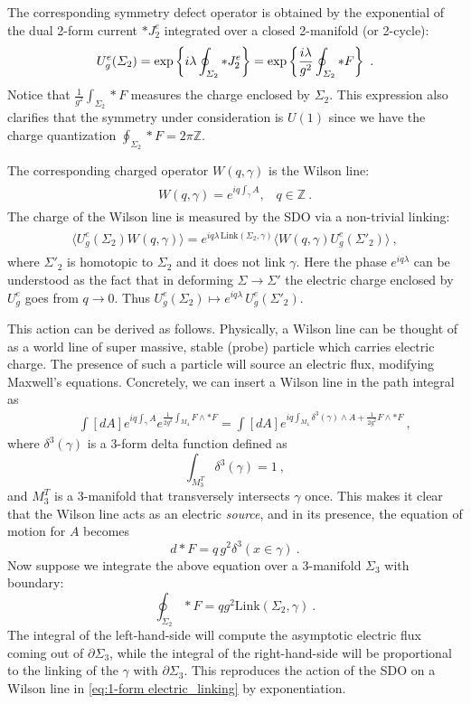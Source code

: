 \documentclass[11pt]{article}
\newcommand{\eq}[1]{\begin{align}\begin{split}#1\end{split}\end{align}}
\def\exp{{\rm exp}}
\def\IZ{{\mathbb{Z}}}
\def\beq{\begin{equation}}
\def\eeq{\end{equation}}
\def\bea{\begin{eqnarray}}
\def\eea{\end{eqnarray}}
\begin{document}
The corresponding symmetry defect operator is obtained by the exponential of the dual 2-form current $\ast J_2^e$ integrated over a closed 2-manifold (or 2-cycle): 
%
\eq{
 U^e_g(\Sigma_2)=\exp\left\{i \lambda \oint_{\Sigma_2} \ast J_2^e\right\}=\exp\left\{\frac{i \lambda }{g^2}\oint_{\Sigma_2} \ast F\right\}~.
}
Notice that $\frac{1}{g^2}\int_{\Sigma_2} \ast F$ measures the charge enclosed by $\Sigma_2$. This expression also clarifies that the symmetry under consideration is $U(1)$ since we have the charge quantization $\oint_{\Sigma_2} \ast  F = 2\pi \IZ$. 

The corresponding charged operator $W (q, \gamma)$ is the Wilson line:
\eq{
W(q, \gamma)=e^{i q\int_\gamma A}, \;\;\; q \in \IZ~.
}
%
The charge of the Wilson line is measured by the SDO via a non-trivial linking:
\eq{\label{eq:1-form electric_linking}
\big\langle U^e_g(\Sigma_{2})W(q, \gamma)\big\rangle=e^{i   q \lambda\, \text{Link} (\Sigma_2, \gamma)} \big\langle W (q, \gamma)  U^e_g(\Sigma'_{2})\big\rangle~,
}
%
where $\Sigma'_2$ is homotopic to $\Sigma_2$ and it does not link $\gamma$.
Here the phase $e^{i  q \lambda}$ can be understood as the fact that in deforming $\Sigma\to \Sigma'$ the electric charge enclosed by $ U^e_g$ goes from $q\to 0$. Thus $ U^e_g(\Sigma_2)\longmapsto e^{i q\lambda}\,  U^e_g(\Sigma'_2)$.    

This action can be derived as follows. 
Physically, a Wilson line can be thought of as a world line of super massive, stable (probe) particle which carries electric charge. The presence of such a particle will source an electric flux, modifying Maxwell's equations. Concretely, we can insert a Wilson line in the path integral as
%
\bea
&& \int [ d A ] e^{i q \int_\gamma A} e^{\frac{1}{2g^2} \int_{M_4} F \wedge \ast  F} = \int [ d A ] e^{i q \int_{M_4} \delta^3 (\gamma) \wedge A + \frac{1}{2g^2} F \wedge \ast  F}~,
\eea
%
where $\delta^3 (\gamma)$ is a 3-form delta function defined as 
%
\beq
\int_{M_3^T} \delta^3 (\gamma) = 1~,
\eeq
%
and $M_3^T$ is a 3-manifold that transversely intersects $\gamma$ once.       
%
This makes it clear that the Wilson line acts as an electric \emph{source}, and in its presence, the equation of motion for $A$ becomes
%
\beq
d \ast  F = q\, g^2 \delta^3 (x\in \gamma)~.
\eeq
% 
Now suppose we integrate the above equation over a 3-manifold $\Sigma_3$ with boundary:
%
\beq
\oint_{\Sigma_2} \ast  F = q g^2 \text{Link} (\Sigma_2, \gamma)~.
\eeq
%
The integral of the left-hand-side will compute the asymptotic electric flux coming out of $\partial \Sigma_3$, while the integral of the right-hand-side will be proportional to the linking of the $\gamma$ with $\partial \Sigma_3$. 
This reproduces the action of the SDO on a Wilson line in \eqref{eq:1-form electric_linking} by exponentiation. 
\end{document}
